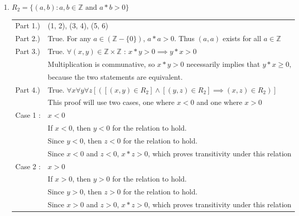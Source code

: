 \documentclass[a4paper,10pt]{article}
\begin{document}
\begin{enumerate}
\begin{enumerate}
    \item $R_2 = \{(a,b) : a,b \in \mathbb{Z} \text{ and } a*b > 0 \}$ \\[.1in]
        \begin{tabular}{l  l}
        Part 1.) & (1, 2), (3, 4), (5, 6) \\
        Part 2.) & True. For any $a \in (\mathbb{Z} - \{0\})$, $ a*a > 0$. Thus $(a, a)$ exists for all $a \in \mathbb{Z}$\\
        Part 3.) & True. $\forall (x,y) \in \mathbb{Z} \times \mathbb{Z}$ : $x*y > 0 \implies y*x > 0$ \\
                 &  Multiplication is communative, so $x*y > 0$ necessarily implies that $y*x \geq 0$, \\
                 &  because the two statements are equivalent. \\
        Part 4.) & True. $\forall x \forall y \forall z [([(x,y) \in R_2] \wedge [(y,z) \in R_2] \implies (x, z) \in R_2) ]$ \\
                 &   This proof will use two cases, one where $x < 0$ and one where $x > 0$ \\
        Case 1 : & $x < 0$ \\
                 & If $x < 0$, then $y < 0$ for the relation to hold. \\
                 & Since $y < 0$, then $z < 0$ for the relation to hold. \\
                 & Since $x < 0$ and $z < 0$, $x*z > 0$, which proves transitivity under this relation \\
        Case 2 : & $x > 0$ \\
                 & If $x > 0$, then $y > 0$ for the relation to hold. \\
                 & Since $y > 0$, then $z > 0$ for the relation to hold. \\
                 & Since $x > 0$ and $z > 0$, $x*z > 0$, which proves transitivity under this relation \\
        \end{tabular}


\end{enumerate}
\end{enumerate}
\end{document}
